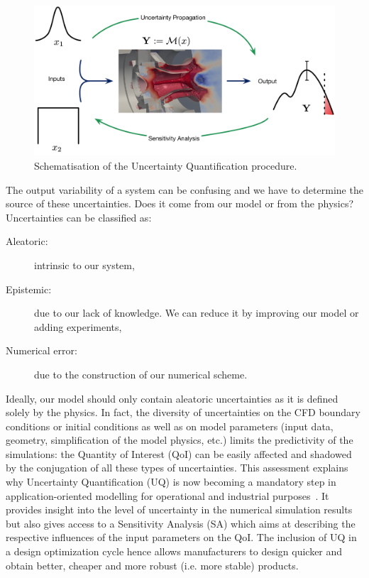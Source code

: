 \begin{figure}[!h]
\centering
\includegraphics[width=\linewidth,keepaspectratio]{fig/literature/schema_UQ.pdf}
\caption{Schematisation of the Uncertainty Quantification procedure.}
\label{fig:context}
\end{figure}

The output variability of a system can be confusing and we have to determine the source of these uncertainties. Does it come from our model or from the physics? Uncertainties can be classified as:

\begin{description}
	\item [Aleatoric:] intrinsic to our system,
	\item [Epistemic:] due to our lack of knowledge. We can reduce it by improving our model or adding experiments,
	\item [Numerical error:] due to the construction of our numerical scheme.
\end{description}

Ideally, our model should only contain aleatoric uncertainties as it is defined solely by the physics. In fact, the diversity of uncertainties on the CFD boundary conditions or initial conditions as well as on model parameters (input data, geometry, simplification of the model physics, etc.) limits the predictivity of the simulations: the Quantity of Interest (QoI) can be easily affected and shadowed by the conjugation of all these types of uncertainties. This assessment explains why Uncertainty Quantification (UQ) is now becoming a mandatory step in application-oriented modelling for operational and industrial purposes~\cite{degennaro2015,masquelet2017}. It provides insight into the level of uncertainty in the numerical simulation results but also gives access to a Sensitivity Analysis (SA) which aims at describing the respective influences of the input parameters on the QoI. The inclusion of UQ in a design optimization cycle hence allows manufacturers to design quicker and obtain better, cheaper and more robust (i.e. more stable) products.

